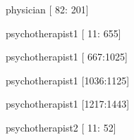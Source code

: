 \documentclass[12pt,a4paper,oneside]{article}
\begin{document}
\begin{itemize}
{ \item physician [  82: 201] }%
{ \item psychotherapist1 [  11: 655] }%
{ \item psychotherapist1 [ 667:1025] }%
{ \item psychotherapist1 [1036:1125] }%
{ \item psychotherapist1 [1217:1443] }%
{ \item psychotherapist2 [  11:  52] }%

\end{itemize}
\end{document}
